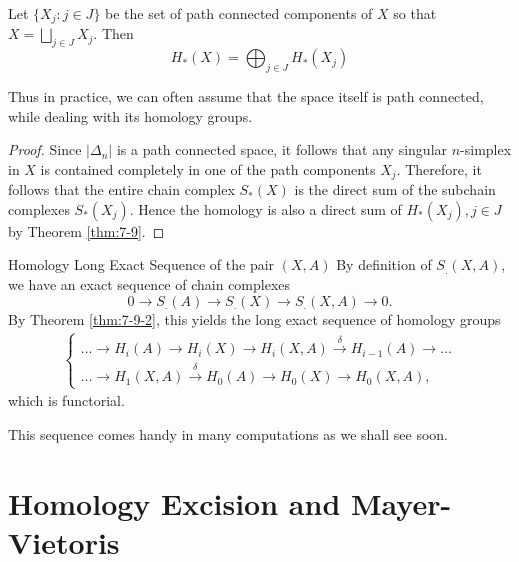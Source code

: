 \documentclass[../main.tex]{subfiles}
\begin{document}
\begin{example}{}{}
    Let $\{X_j : j \in J\}$ be the set of path connected components of $X$ so that $X = \bigsqcup_{j \in J} X_j$. Then \[
    H_{*}\left( X \right)= \bigoplus _{j \in J}H_{*}\left( X_{j} \right)  
    \]
\end{example}
\begin{remark}
    Thus in practice, we can often assume that the space itself is path connected, while dealing with its homology groups.
\end{remark}
\begin{proof}
 Since $|\Delta_n|$ is a path connected space, it follows that any singular $n$-simplex in $X$ is contained completely in one of the path components $X_j$. Therefore, it follows that the entire chain complex $S_*(X)$ is the direct sum of the subchain complexes $S_*(X_j)$. Hence the homology is also a direct sum of $H_*(X_j), j \in J$ by Theorem \ref{thm:7-9}. 
\end{proof}

\begin{theorem}{Homology Long Exact Sequence of the pair \(  \left( X,A \right)   \) }{}
    By definition of $S_.(X,A)$, we have an exact sequence of chain complexes
\[
0 \to S_.(A) \to S_.(X) \to S_.(X, A) \to 0.
\]By Theorem \ref{thm:7-9-2}, this yields the long exact sequence of homology groups
\begin{gather*}
    \left\{
    \begin{gathered}
        \dots \to H_i(A) \to H_i(X) \to H_i(X,A) \xrightarrow{\delta} H_{i-1}(A) \to \dots \\
        \dots \to H_1(X,A) \xrightarrow{\delta} H_0(A) \to H_0(X) \to H_0(X,A),
    \end{gathered}
    \right.
    \tag{4.6}
\end{gather*}
which is functorial.
\end{theorem}
\begin{remark}
     This sequence comes handy in many computations as we shall see soon.
\end{remark}

\section{Homology Excision and Mayer-Vietoris}
\end{document}
